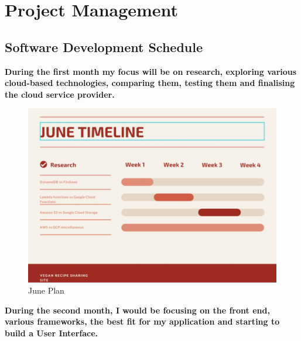 %
%
\chapter{Project Management}%
%
\label{chapter:project_management}

\section{Software Development Schedule}
\textbf{During the first month my focus will be on research, exploring various cloud-based technologies, comparing them, 
testing them and finalising the cloud service provider.}

\begin{figure}[!hb]
\centering
\caption[June Plan]{June Plan}%
\label{fig:june}
\includegraphics[width=\linewidth,height=\textheight,keepaspectratio]{img/june}
\end{figure}

\clearpage

\textbf{During the second month, I would be focusing on the front end, various frameworks, the best fit for my application 
and starting to build a User Interface.}

